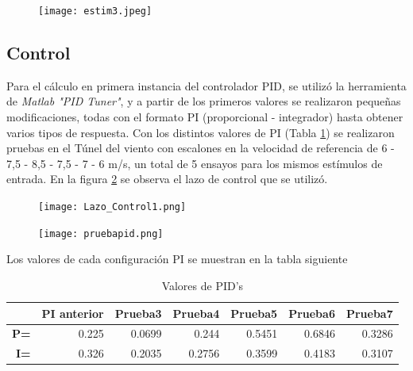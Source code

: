 \begin{figure}[H]
	\centering
	\texttt{[image: estim3.jpeg]}
	\label{fig:estim3}
\end{figure}
       
    \subsection{Control}
    Para el cálculo en primera instancia del controlador PID, se utilizó la herramienta de \textit{Matlab "PID Tuner"}, y a partir de los primeros valores se realizaron pequeñas modificaciones, todas con el formato PI (proporcional - integrador) hasta obtener varios tipos de respuesta.
    Con los distintos valores de PI (Tabla \ref{tab:pid}) se realizaron pruebas en el Túnel del viento con escalones en la velocidad de referencia de 6 - 7,5 - 8,5 - 7,5 - 7 - 6 m/s,  un total de 5 ensayos para los mismos estímulos de entrada. En la figura \ref{fig:Lazo_Control} se observa el lazo de control que se utilizó. 
   
    \begin{figure}[H]
   	\centering
   	\texttt{[image: Lazo\_Control1.png]}
   	\label{fig:Lazo_Control}
   \end{figure}
    \begin{figure}[H]
    	\centering
    	\texttt{[image: pruebapid.png]}
    	\label{fig:PI3}
    \end{figure}
    
    Los valores de cada configuración PI se muestran en la tabla siguiente
    \begin{table}[H]
    	\centering
    	\begin{tabular}{r|r|r|r|r|r|r|}
    		\cline{2-7}
    		\multicolumn{1}{l|}{} & \multicolumn{1}{c|}{\textbf{PI anterior}} & \multicolumn{1}{c|}{\textbf{Prueba3}} & \multicolumn{1}{c|}{\textbf{Prueba4}} & \multicolumn{1}{c|}{\textbf{Prueba5}} & \multicolumn{1}{c|}{\textbf{Prueba6}} & \multicolumn{1}{c|}{\textbf{Prueba7}} \\ \hline
    		\multicolumn{1}{|r|}{\textbf{P=}} & 0.225 & 0.0699 & 0.244 & 0.5451 & 0.6846 & 0.3286 \\ \hline
    		\multicolumn{1}{|r|}{\textbf{I=}} & 0.326 & 0.2035 & 0.2756 & 0.3599 & 0.4183 & 0.3107 \\ \hline
    	\end{tabular}
    \caption{Valores de PID's}
    \label{tab:pid}
    \end{table}
    

